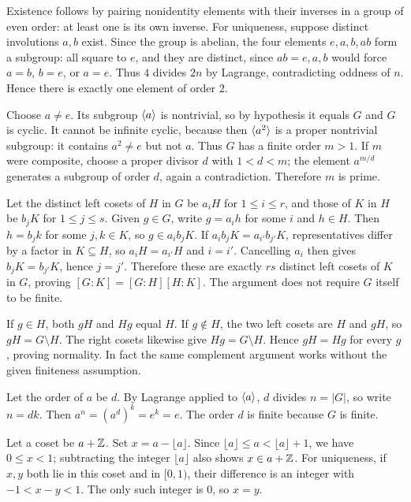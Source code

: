 Existence follows by pairing nonidentity elements with their inverses in a group of even order: at least one is its own inverse. For uniqueness, suppose distinct involutions $a,b$ exist. Since the group is abelian, the four elements $e,a,b,ab$ form a subgroup: all square to $e$, and they are distinct, since $ab=e,a,b$ would force $a=b$, $b=e$, or $a=e$. Thus $4$ divides $2n$ by Lagrange, contradicting oddness of $n$. Hence there is exactly one element of order $2$.

Choose $a\ne e$. Its subgroup $\langle a\rangle$ is nontrivial, so by hypothesis it equals $G$ and $G$ is cyclic. It cannot be infinite cyclic, because then $\langle a^2\rangle$ is a proper nontrivial subgroup: it contains $a^2\ne e$ but not $a$. Thus $G$ has a finite order $m>1$. If $m$ were composite, choose a proper divisor $d$ with $1<d<m$; the element $a^{m/d}$ generates a subgroup of order $d$, again a contradiction. Therefore $m$ is prime.

Let the distinct left cosets of $H$ in $G$ be $a_iH$ for $1\le i\le r$, and those of $K$ in $H$ be $b_jK$ for $1\le j\le s$.
 Given $g\in G$, write $g=a_ih$ for some $i$ and $h\in H$. Then $h=b_jk$ for some $j,k\in K$, so $g\in a_ib_jK$.
 If $a_ib_jK=a_{i'}b_{j'}K$, representatives differ by a factor in $K\subseteq H$, so $a_iH=a_{i'}H$ and $i=i'$. Cancelling $a_i$ then gives $b_jK=b_{j'}K$, hence $j=j'$.
Therefore these are exactly $rs$ distinct left cosets of $K$ in $G$, proving $[G:K]=[G:H][H:K]$. The argument does not require $G$ itself to be finite.

If $g\in H$, both $gH$ and $Hg$ equal $H$. If $g\notin H$, the two left cosets are $H$ and $gH$, so $gH=G\setminus H$. The right cosets likewise give $Hg=G\setminus H$. Hence $gH=Hg$ for every $g$, proving normality. In fact the same complement argument works without the given finiteness assumption.

Let the order of $a$ be $d$. By Lagrange applied to $\langle a\rangle$, $d$ divides $n=|G|$, so write $n=dk$. Then $a^n=(a^d)^k=e^k=e$. The order $d$ is finite because $G$ is finite.

\exercise{10.41}{A unique representative in $[0,1)$}
Let a coset be $a+\mathbb{Z}$. Set $x=a-\lfloor a\rfloor$. Since $\lfloor a\rfloor\le a<\lfloor a\rfloor+1$, we have $0\le x<1$; subtracting the integer $\lfloor a\rfloor$ also shows $x\in a+\mathbb{Z}$. For uniqueness, if $x,y$ both lie in this coset and in $[0,1)$, their difference is an integer with $-1<x-y<1$. The only such integer is $0$, so $x=y$.

